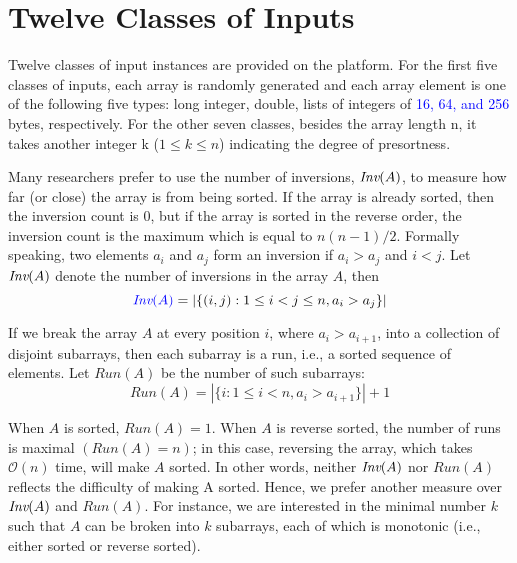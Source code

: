 \documentclass[AMA,STIX1COL]{WileyNJD-v2}
\newcommand{\qusort}{\emph{quicksort }}
\newcommand{\msort}{\emph{mergesort }}
\begin{document}

\section{Twelve Classes of Inputs}
Twelve classes of input instances are provided on the platform.
For the first five classes of inputs, each array is randomly generated and each array element is one of the following five types: long integer, double, lists of integers of \textcolor{blue}{16, 64, and 256} bytes, respectively. 
For the other seven classes, besides the array length n, it takes another integer k ($1 \leq k \leq n$) indicating the degree of presortness.  

Many researchers prefer to use the number of inversions, \textcolor{blue}{$\mbox{\it Inv}(A)$}, 
to measure how far (or close) the array is from being sorted. If the array is already sorted, then the inversion count is 0, but if the array is sorted in the reverse order, the inversion count is the maximum which is equal to $n(n-1)/2$. Formally speaking, two elements $a_i$ and $a_j$ form an inversion if $a_i > a_j$ and $i < j$. Let \textcolor{blue}{$\mbox{\it Inv}(A)$} denote the number of inversions in the array $A$, then
\[ \textcolor{blue}{\mbox{\it Inv}(A)} = | \{(i, j) : 1 \leq i < j \leq n, a_i > a_j\} | \]            

If we break the array $A$ at every position $i$, where $a_i > a_{i+1}$, into a collection of disjoint subarrays, then each subarray is a run, i.e., a sorted sequence of elements.  
Let $Run(A)$ be the number of such subarrays: 
\[ Run(A) = | \{i : 1 \leq i < n, a_i > a_{i+1}\} | + 1 \]     

When $A$ is sorted, $Run(A) = 1$. When $A$ is reverse sorted, the number of runs is maximal $(Run(A) = n)$; in this case, reversing the array, which takes $\mathcal{O}(n)$ time, will make $A$ sorted. 
In other words, neither \textcolor{blue}{$\mbox{\it Inv}(A)$} nor $Run(A)$ reflects the difficulty of making A sorted. 
Hence, we prefer another measure over \textcolor{blue}{$\mbox{\it Inv}(A)$} and $Run(A)$. 
For instance, we are interested in the minimal number $k$ such that $A$ can be broken into $k$ subarrays, each of which is monotonic (i.e., either sorted or reverse sorted).       
\end{document}
